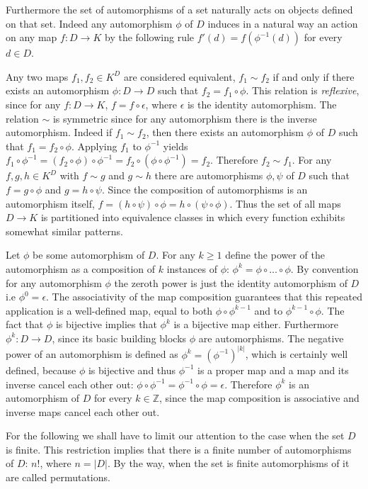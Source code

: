 \documentclass[a4paper]{article}
\newcommand{\brac}[1]{{\left({#1}\right)}}
\begin{document}
Furthermore the set of automorphisms of a set naturally acts on objects defined on that set. Indeed any automorphism $\phi$ of $D$ induces in a natural way an action on any map $f:D\to K$ by the following rule $f'(d) = f\brac{\phi^{-1}(d)}$ for every $d\in D$.

Any two maps $f_1, f_2\in K^D$ are considered equivalent, $f_1\sim f_2$ if and only if there exists an automorphism $\phi:D\to D$ such that $f_2 = f_1\circ \phi$.
This relation is \emph{reflexive}, since for any $f:D\to K$, $f = f\circ \epsilon$, where $\epsilon$ is the identity automorphism.
The relation $\sim$ is symmetric since for any automorphism there is the inverse automorphism. Indeed if $f_1\sim f_2$, then there exists an automorphism $\phi$ of $D$ such that $f_1=f_2\circ \phi$. Applying $f_1$ to $\phi^{-1}$ yields $f_1\circ \phi^{-1} = \brac{f_2\circ\phi} \circ\phi^{-1} = f_2\circ \brac{\phi\circ \phi^{-1}} = f_2$. Therefore $f_2\sim f_1$.
For any $f, g, h\in K^D$ with $f\sim g$ and $g\sim h$ there are automorphisms $\phi, \psi$ of $D$ such that $f = g\circ \phi$ and $g = h\circ \psi$. Since the composition of automorphisms is an automorphism itself, $f=\brac{h\circ \psi}\circ \phi = h\circ \brac{\psi\circ \phi}$.
Thus the set of all maps $D\to K$ is partitioned into equivalence classes in which every function exhibits somewhat similar patterns.

Let $\phi$ be some automorphism of $D$. For any $k\geq 1$ define the power of the automorphism as a composition of $k$ instances of $\phi$: $\phi^k = \phi\circ \ldots \circ \phi$. By convention for any automorphism $\phi$ the zeroth power is just the identity automorphism of $D$ i.e $\phi^0 = \epsilon$. The associativity of the map composition guarantees that this repeated application is a well-defined map, equal to both $\phi\circ\phi^{k-1}$ and to $\phi^{k-1}\circ \phi$. The fact that $\phi$ is bijective implies that $\phi^k$ is a bijective map either. Furthermore $\phi^k:D\to D$, since its basic building blocks $\phi$ are automorphisms.
The negative power of an automorphism is defined as $\phi^k = \brac{\phi^{-1}}^{|k|}$, which is certainly well defined, because $\phi$ is bijective and thus $\phi^{-1}$ is a proper map and a map and its inverse cancel each other out: $\phi\circ \phi^{-1} = \phi^{-1}\circ \phi = \epsilon$. Therefore $\phi^k$ is an automorphism of $D$ for every $k\in \mathbb{Z}$, since the map composition is associative and inverse maps cancel each other out.

For the following we shall have to limit our attention to the case when the set $D$ is finite. This restriction implies that there is a finite number of automorphisms of $D$: $n!$, where $n=|D|$. By the way, when the set is finite automorphisms of it are called permutations.
\end{document}
